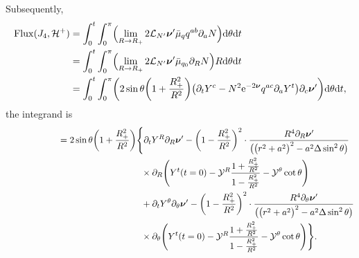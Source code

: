 \documentclass[11pt]{article}
\numberwithin{equation}{section}
\def\ptl{\partial}%
\def\mbo#1{\boldsymbol{#1}}%
\numberwithin{equation}{section}
\begin{document}
Subsequently,
\begin{align*}
{\rm Flux} (J_4, \mathcal{H}^+) &{}= \int^t_0 \int^\pi _0 \Bigl(\lim_{R \to R_+} 2 \mathcal{L}_{N'} \mbo{\nu}' \bar{\mu}_q q^{ab} \ptl_a N \Bigr) {\rm d}\theta {\rm d}t \notag\\
&{}= \int^t_0 \int^\pi _0 \Bigl(\lim_{R \to R_+} 2 \mathcal{L}_{N'} \mbo{\nu}' \bar{\mu}_{q_0} \ptl_R N \Bigr) R {\rm d}\theta {\rm d}t \notag\\
&{}= \int^t_0 \int^\pi _0 \biggl(2 \sin \theta \biggl(1+ \frac{R^2_+}{R^2} \biggr) \bigl(\ptl_t Y^c - N^2 {\rm e}^{-2 \mbo{\nu}} q^{ac} \ptl_a Y^t\bigr) \ptl_c \mbo{\nu}' \biggr) {\rm d}\theta {\rm d}t,
\end{align*}
the integrand is
\begin{align*}
\hphantom{{\rm Flux} (J_4, \mathcal{H}^+)}&{}= 2 \sin \theta \biggl(1+ \frac{R^2_+}{R^2} \biggr) \Biggl\{ \ptl_t Y^R \ptl_R \mbo{\nu}' - \biggl(1- \frac{R^2_+}{R^2} \biggr)^2 \cdot \frac{R^4 \ptl_R \mbo{\nu}'}{ \bigl( \bigl(r^2+a^2\bigr)^2 -a^2 \Delta
	\sin^2 \theta \bigr)} \notag\\
& \hphantom{= 2 \sin \theta \biggl(1+ \frac{R^2_+}{R^2} \biggr) \Biggl\{}{}
\times \ptl_R \Biggl(Y^t (t=0) - \mathcal{Y}^R \frac{1 + \frac{R^2_+}{R^2}} {{1-\frac{R^2_+}{R^2}} } - \mathcal{Y}^ \theta \cot \theta \Biggr) \notag\\
&\hphantom{= 2 \sin \theta \biggl(1+ \frac{R^2_+}{R^2} \biggr) \Biggl\{}{}
+ \ptl_t Y^\theta \ptl_\theta \mbo{\nu}' - \biggl(1 - \frac{R^2_+}{R^2} \biggr)^2 \cdot \frac{R^4 \ptl_\theta \mbo{\nu}'}{ \bigl(\bigl(r^2+a^2\bigr)^2 -a^2 \Delta \sin^2 \theta\bigr)} \notag\\
& \hphantom{= 2 \sin \theta \biggl(1+ \frac{R^2_+}{R^2} \biggr) \Biggl\{}{}
\times \ptl_\theta \Biggl(Y^t(t=0) - \mathcal{Y}^R \frac{1+ \frac{R^2_+}{R^2}}{1-\frac{R^2_+}{R^2}} - \mathcal{Y}^\theta \cot \theta \Biggr) \Biggr\}.
\end{align*}
\end{document}
